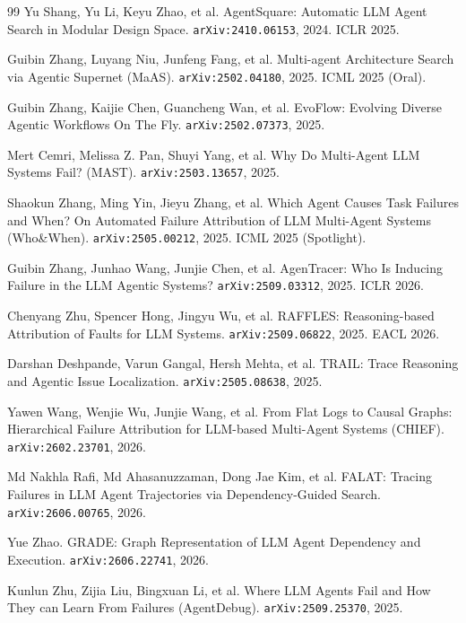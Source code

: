 \begin{thebibliography}{99}
 Yu Shang, Yu Li, Keyu Zhao, et al. AgentSquare:
  Automatic LLM Agent Search in Modular Design Space.
  \texttt{arXiv:2410.06153}, 2024. ICLR 2025.

 Guibin Zhang, Luyang Niu, Junfeng Fang, et al. Multi-agent
  Architecture Search via Agentic Supernet (MaAS). \texttt{arXiv:2502.04180},
  2025. ICML 2025 (Oral).

 Guibin Zhang, Kaijie Chen, Guancheng Wan, et al.
  EvoFlow: Evolving Diverse Agentic Workflows On The Fly.
  \texttt{arXiv:2502.07373}, 2025.

 Mert Cemri, Melissa Z. Pan, Shuyi Yang, et al. Why Do
  Multi-Agent LLM Systems Fail? (MAST). \texttt{arXiv:2503.13657}, 2025.

 Shaokun Zhang, Ming Yin, Jieyu Zhang, et al. Which
  Agent Causes Task Failures and When? On Automated Failure Attribution
  of LLM Multi-Agent Systems (Who\&When). \texttt{arXiv:2505.00212}, 2025.
  ICML 2025 (Spotlight).

 Guibin Zhang, Junhao Wang, Junjie Chen, et al.
  AgenTracer: Who Is Inducing Failure in the LLM Agentic Systems?
  \texttt{arXiv:2509.03312}, 2025. ICLR 2026.

 Chenyang Zhu, Spencer Hong, Jingyu Wu, et al. RAFFLES:
  Reasoning-based Attribution of Faults for LLM Systems.
  \texttt{arXiv:2509.06822}, 2025. EACL 2026.

 Darshan Deshpande, Varun Gangal, Hersh Mehta, et al.
  TRAIL: Trace Reasoning and Agentic Issue Localization.
  \texttt{arXiv:2505.08638}, 2025.

 Yawen Wang, Wenjie Wu, Junjie Wang, et al. From Flat Logs
  to Causal Graphs: Hierarchical Failure Attribution for LLM-based
  Multi-Agent Systems (CHIEF). \texttt{arXiv:2602.23701}, 2026.

 Md Nakhla Rafi, Md Ahasanuzzaman, Dong Jae Kim, et al.
  FALAT: Tracing Failures in LLM Agent Trajectories via Dependency-Guided
  Search. \texttt{arXiv:2606.00765}, 2026.

 Yue Zhao. GRADE: Graph Representation of LLM Agent
  Dependency and Execution. \texttt{arXiv:2606.22741}, 2026.

 Kunlun Zhu, Zijia Liu, Bingxuan Li, et al. Where LLM
  Agents Fail and How They can Learn From Failures (AgentDebug).
  \texttt{arXiv:2509.25370}, 2025.


\end{thebibliography}
